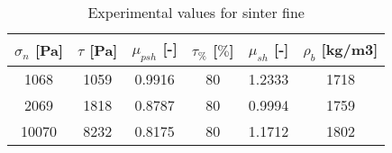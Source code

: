\begin{table}[h]
\centering
\begin{tabular}{cccccc}
$\sigma_n$ [Pa] & $\tau$ [Pa] & $\mu_{psh}$ [-] & $\tau_{\%}$ [$\%$] &
$\mu_{sh}$ [-] & $\rho_b$ [kg/m3] \\
\hline
    1068  & 1059  & 0.9916 & 80 & 1.2333 & 1718 \\
    2069  & 1818  & 0.8787 & 80 & 0.9994 & 1759 \\
    10070 & 8232  & 0.8175 & 80 & 1.1712 & 1802 \\

\hline
\end{tabular}
\caption{Experimental values for sinter fine}
\label{tab:05sinterTableExperimental}
\end{table}